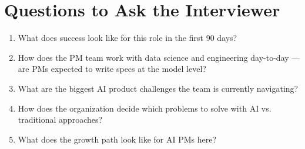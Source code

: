 \documentclass[10pt, letterpaper]{article}
\begin{document}
\section{Questions to Ask the Interviewer}

\begin{enumerate}[leftmargin=1.5em, itemsep=3pt]
    \item What does success look like for this role in the first 90 days?
    \item How does the PM team work with data science and engineering day-to-day --- are PMs expected to write specs at the model level?
    \item What are the biggest AI product challenges the team is currently navigating?
    \item How does the organization decide which problems to solve with AI vs. traditional approaches?
    \item What does the growth path look like for AI PMs here?
\end{enumerate}
\end{document}
